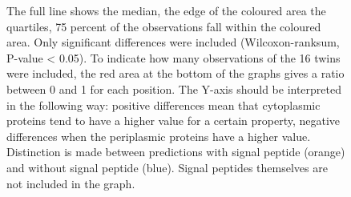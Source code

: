\begin{figure}[h!]
{The full line shows the median, the edge of the coloured area the quartiles,
75 percent of the observations fall within the coloured area.
Only significant differences were included (Wilcoxon-ranksum, P-value < 0.05).
To indicate how many observations of the 16 twins were included,
the red area at the bottom of the graphs gives a ratio between 0 and 1 for each position.
The Y-axis should be interpreted in the following way:
positive differences mean that cytoplasmic proteins tend to have a higher value for a certain property,
negative differences when the periplasmic proteins have a higher value.
Distinction is made between predictions with signal peptide (orange) and without signal peptide (blue).
Signal peptides themselves are not included in the graph.
}
~\end{figure}
